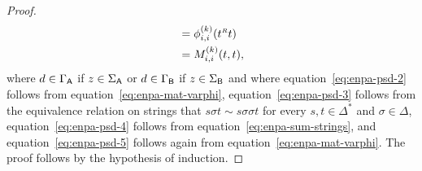\begin{proof}
\begin{align}
		&= \phi_{i,i}^{(k)}(t^\mathsmaller{R}t) \label{eq:enpa-psd-4} \\
		&= M_{i,i}^{(k)}(t,t) \label{eq:enpa-psd-5},
	\end{align}	 
	where $d \in \Gamma_{\mathsf{A}}$ if $z \in \Sigma_{\mathsf{A}}$ or $d \in \Gamma_{\mathsf{B}}$ if $z \in \Sigma_{\mathsf{B}}$ and where equation~\eqref{eq:enpa-psd-2} follows from equation~\eqref{eq:enpa-mat-varphi}, equation~\eqref{eq:enpa-psd-3} follows from the equivalence relation on strings that $s \sigma t \sim s \sigma \sigma t$ for every $s,t \in \Delta^{\ast}$ and $\sigma \in \Delta$, equation~\eqref{eq:enpa-psd-4} follows from equation~\eqref{eq:enpa-sum-strings}, and equation~\eqref{eq:enpa-psd-5} follows again from equation~\eqref{eq:enpa-mat-varphi}. The proof follows by the hypothesis of induction. 
\end{proof}

